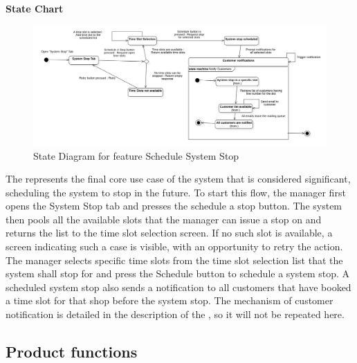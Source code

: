 \textbf{State Chart}

\begin{figure}[H]
    \centering
    \includegraphics[height=0.4\textwidth]{Images/StateCharts/ScheduleSystemStop.png}
    \caption{State Diagram for feature Schedule System Stop}
    \label{fig:SDScheduleStop}
\end{figure}

The  represents the final core use case of the system that is considered significant, scheduling the system to stop in the future.
To start this flow, the manager first opens the System Stop tab and presses the schedule a stop button.
The system then pools all the available slots that the manager can issue a stop on and returns the list to the time slot selection screen.
If no such slot is available, a screen indicating such a case is visible, with an opportunity to retry the action.
The manager selects specific time slots from the time slot selection list that the system shall stop for and press the Schedule button to schedule a system stop.
A scheduled system stop also sends a notification to all customers that have booked a time slot for that shop before the system stop.
The mechanism of customer notification is detailed in the description of the , so it will not be repeated here.


\subsection{Product functions}



